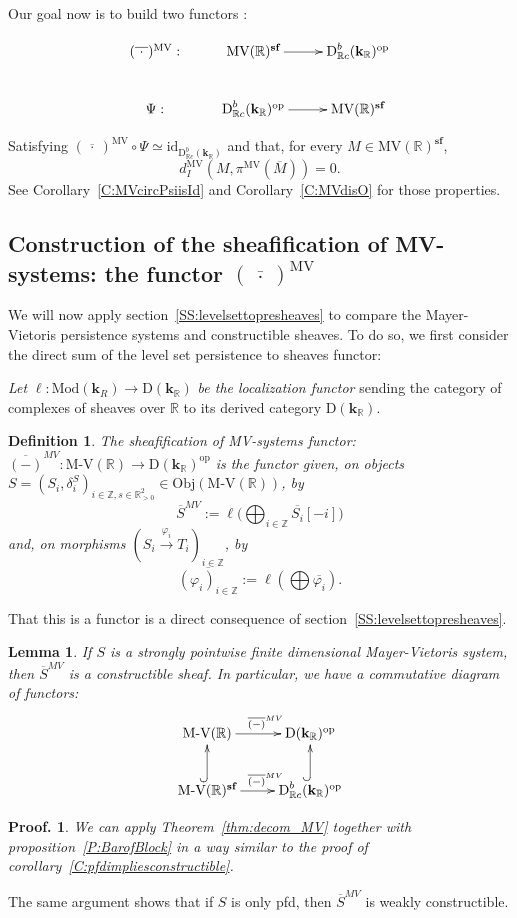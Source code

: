 \documentclass[a4paper, english, 11pt]{article}
\newcommand{\kk}[0]{\textbf{k}}
\newcommand{\Mod}[0]{\text{Mod}}
\newcommand{\0}{\vec{0}}
\newcommand{\R}[0]{\mathbb{R}}
\newcommand{\Z}[0]{\mathbb{Z}}
\newcommand{\D}[0]{\text{D}}
\newcommand{\Obj}[0]{\text{Obj}}
\newcommand{\op}[0]{\text{op}}
\newcommand{\MV}{\text{MV}}
\newcommand{\s}{\textbf{sf}}
\newtheorem*{pf}{Proof.} }
\newtheorem{lem}[prop]{Lemma}
\newtheorem{defi}[prop]{Definition}
\begin{document}
Our goal now is to build two functors : 


$$\xymatrix{
(\overline{~\cdot~ })^{\text{MV}} :&  \text{MV}(\R)^\s \ar[r] &\D^b_{\R c}(\kk_\R)^{\op}  \\
\Psi  :&  \D^b_{\R c}(\kk_\R)^{\op} \ar[r] & \text{MV}(\R)^\s 
}$$

Satisfying $(\overline{~\cdot~ })^{\text{MV}} \circ \Psi \simeq \text{id}_{\D^b_{\R c}(\kk_\R)}$ and that, for every $M\in \text{MV}(\R)^\s$, $$d_I^{\text{MV}}(M, \pi^\MV ( \overline{M})) = 0.$$
See Corollary~\ref{C:MVcircPsiisId} and Corollary~\ref{C:MVdisO} for those properties.
\subsection{Construction of the sheafification of MV-systems: the functor $(\overline{~\cdot~ })^{\text{MV}}$}\label{SS:MVfunctor}
We will now apply section~\ref{SS:levelsettopresheaves} to compare the Mayer-Vietoris persistence systems and constructible sheaves. To do so, we first consider the direct sum of the level set persistence to sheaves functor: 

\emph{Let} $\ell:\Mod(\kk_R) \to  \D(\kk_\R)$ \emph{be the localization functor} sending the category of complexes of sheaves over $\R$ to its derived category $\D(\kk_\R)$.
\begin{defi}\label{D:MVtoSheaves} The \emph{sheafification of MV-systems functor}: $\overline{(-)}^{MV}: \text{M-V}(\R) \to  \D(\kk_\R)^{\op}$ is the functor given, on
objects $S=(S_i, \delta_i^S)_{i\in \Z, s\in \R^2_{>0}}\in \Obj(\text{M-V}(\R))$, by 
$$ \overline{S}^{MV} := \ell\Big(\bigoplus_{i\in \Z} \overline{S_i}[-i]\Big)$$ and, on morphisms $(S_i\stackrel{\varphi_i}\to T_i)_{i\in \Z}$, by 
$$\overline{(\varphi_i)_{i\in \Z}} := \ell\left(\bigoplus \overline{\varphi_i}\right). $$ 
\end{defi}
That this is a functor is a direct consequence of section~\ref{SS:levelsettopresheaves}.

\begin{lem}
 If $S$ is a strongly pointwise finite dimensional Mayer-Vietoris system, then $\overline{S}^{MV}$ is a constructible sheaf. In particular, we have a commutative diagram of functors:
 $$\xymatrix{ \text{M-V}(\R) \ar[r]^{\quad\overline{(-)}^{MV}} & \D(\kk_\R)^{\op} \\ 
 \text{M-V}(\R)^{\s} \ar@{^{(}->}[u]\ar[r]^{\quad\overline{(-)}^{MV}} & \D^b_{\R c}(\kk_\R)^{\op} \ar@{^{(}->}[u].}  $$
\end{lem}
\begin{pf}
 We can apply Theorem~\ref{thm:decom_MV} together with proposition~\ref{P:BarofBlock} in a way similar to the proof of corollary~\ref{C:pfdimpliesconstructible}.
\end{pf}
The same argument shows that if $S$ is only pfd, then $\overline{S}^{MV}$ is weakly constructible.
\end{document}
